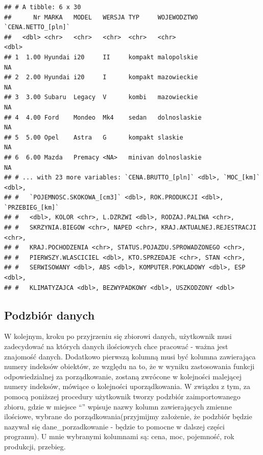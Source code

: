 \documentclass[12pt,a4paper]{report}
\begin{document}
{\begin{verbatim}
## # A tibble: 6 x 30
##      Nr MARKA   MODEL   WERSJA TYP     WOJEWODZTWO  `CENA.NETTO_[pln]`
##   <dbl> <chr>   <chr>   <chr>  <chr>   <chr>                     <dbl>
## 1  1.00 Hyundai i20     II     kompakt malopolskie                  NA
## 2  2.00 Hyundai i20     I      kompakt mazowieckie                  NA
## 3  3.00 Subaru  Legacy  V      kombi   mazowieckie                  NA
## 4  4.00 Ford    Mondeo  Mk4    sedan   dolnoslaskie                 NA
## 5  5.00 Opel    Astra   G      kompakt slaskie                      NA
## 6  6.00 Mazda   Premacy <NA>   minivan dolnoslaskie                 NA
## # ... with 23 more variables: `CENA.BRUTTO_[pln]` <dbl>, `MOC_[km]` <dbl>,
## #   `POJEMNOSC.SKOKOWA_[cm3]` <dbl>, ROK.PRODUKCJI <dbl>, `PRZEBIEG_[km]`
## #   <dbl>, KOLOR <chr>, L.DZRZWI <dbl>, RODZAJ.PALIWA <chr>,
## #   SKRZYNIA.BIEGOW <chr>, NAPED <chr>, KRAJ.AKTUALNEJ.REJESTRACJI <chr>,
## #   KRAJ.POCHODZENIA <chr>, STATUS.POJAZDU.SPROWADZONEGO <chr>,
## #   PIERWSZY.WLASCICIEL <dbl>, KTO.SPRZEDAJE <chr>, STAN <chr>,
## #   SERWISOWANY <dbl>, ABS <dbl>, KOMPUTER.POKLADOWY <dbl>, ESP <dbl>,
## #   KLIMATYZAJCA <dbl>, BEZWYPADKOWY <dbl>, USZKODZONY <dbl>
\end{verbatim}

\subsection{Podzbiór danych}\label{podzbior-danych}

W kolejnym, kroku po przyjrzeniu się zbiorowi danych, użytkownik musi
zadecydować na których danych ilościowych chce pracować - ważna jest
znajomość danych. Dodatkowo pierwszą kolumną musi być kolumna
zawierająca numery indeksów obiektów, ze względu na to, że w wyniku
zastosowania funkcji odpowiedzialnej za porządkowanie, zostaną zwrócone
w kolejności malejącej numery indeksów, mówiące o kolejności
uporządkowania. W związku z tym, za pomocą poniższej procedury
użytkownik tworzy podzbiór zaimportowanego zbioru, gdzie w miejsce ``''
wpisuje nazwy kolumn zawierających zmienne ilościowe, wybrane do
porządkowania(przyjmijmy założenie, że podzbiór będzie nazywał się
dane\_porzadkowanie - będzie to pomocne w dalszej części programu). U
mnie wybranymi kolumnami są: cena, moc, pojemność, rok produkcji,
przebieg.

\begin{Shaded}
\begin{Highlighting}[]
\NormalTok{dane_porzadkowanie<-zbior_danych[}\NormalTok{(}\NormalTok{,}\NormalTok{,}\NormalTok{,}
                                   \NormalTok{,}
                                  \NormalTok{,}\NormalTok{)]}
\end{Highlighting}
\end{Shaded}

}
\end{document}
